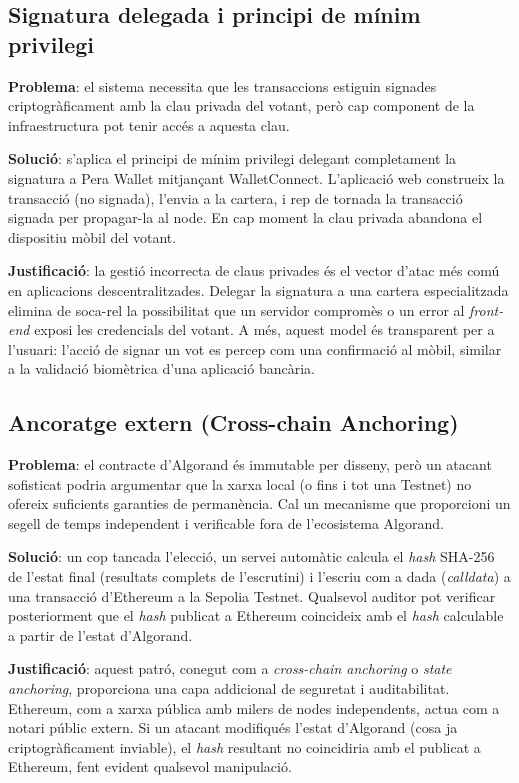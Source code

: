 \subsection{Signatura delegada i principi de mínim privilegi}
 
\textbf{Problema}: el sistema necessita que les transaccions estiguin signades criptogràficament amb la clau privada del votant, però cap component de la infraestructura pot tenir accés a aquesta clau.
 
\textbf{Solució}: s'aplica el principi de mínim privilegi delegant completament la signatura a Pera Wallet mitjançant WalletConnect. L'aplicació web construeix la transacció (no signada), l'envia a la cartera, i rep de tornada la transacció signada per propagar-la al node. En cap moment la clau privada abandona el dispositiu mòbil del votant.
 
\textbf{Justificació}: la gestió incorrecta de claus privades és el vector d'atac més comú en aplicacions descentralitzades. Delegar la signatura a una cartera especialitzada elimina de soca-rel la possibilitat que un servidor compromès o un error al \textit{front-end} exposi les credencials del votant. A més, aquest model és transparent per a l'usuari: l'acció de signar un vot es percep com una confirmació al mòbil, similar a la validació biomètrica d'una aplicació bancària.
 
\subsection{Ancoratge extern (Cross-chain Anchoring)}
 
\textbf{Problema}: el contracte d'Algorand és immutable per disseny, però un atacant sofisticat podria argumentar que la xarxa local (o fins i tot una Testnet) no ofereix suficients garanties de permanència. Cal un mecanisme que proporcioni un segell de temps independent i verificable fora de l'ecosistema Algorand.
 
\textbf{Solució}: un cop tancada l'elecció, un servei automàtic calcula el \textit{hash} SHA-256 de l'estat final (resultats complets de l'escrutini) i l'escriu com a dada (\textit{calldata}) a una transacció d'Ethereum a la Sepolia Testnet. Qualsevol auditor pot verificar posteriorment que el \textit{hash} publicat a Ethereum coincideix amb el \textit{hash} calculable a partir de l'estat d'Algorand.
 
\textbf{Justificació}: aquest patró, conegut com a \textit{cross-chain anchoring} o \textit{state anchoring}, proporciona una capa addicional de seguretat i auditabilitat. Ethereum, com a xarxa pública amb milers de nodes independents, actua com a notari públic extern. Si un atacant modifiqués l'estat d'Algorand (cosa ja criptogràficament inviable), el \textit{hash} resultant no coincidiria amb el publicat a Ethereum, fent evident qualsevol manipulació.
 

